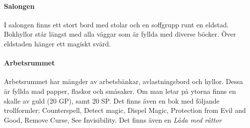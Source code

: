 \paragraph{Salongen}
I salongen finns ett stort bord med stolar och en soffgrupp runt en eldstad. Bokhyllor står längst med alla väggar som är fyllda med diverse böcker. Över eldstaden hänger ett magiskt svärd. 

\paragraph{Arbetsrummet}
Arbetsrummet har mängder av arbetsbänkar, avlastningsbord och hyllor. Dessa är fyllda mad papper, flaskor och småsaker. Om man letar på ytorna finns en skalle av guld (20 GP), samt 20 SP. Det finns även en bok med följande trollformler; Counterspell, Detect magic, Dispel Magic, Protection from Evil and Good, Remove Curse, See Invisibility. Det finns även en \textit{Låda med råttor} \sectiondescribe{\ref{ladaMedRattor}}
